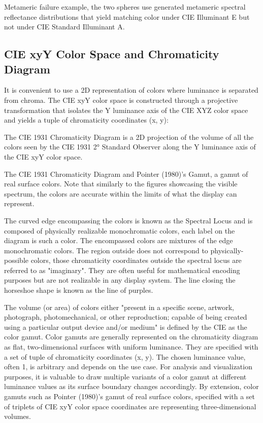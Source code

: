 Metameric failure example, the two spheres use generated metameric spectral reflectance distributions that yield matching color under CIE Illuminant E but not under CIE Standard Illuminant A.

\subsection{CIE xyY Color Space and Chromaticity Diagram}

It is convenient to use a 2D representation of colors where luminance is separated from chroma. The CIE xyY color space is constructed through a projective transformation that isolates the Y luminance axis of the CIE XYZ color space and yields a tuple of chromaticity coordinates (x, y):

The CIE 1931 Chromaticity Diagram is a 2D projection of the volume of all the colors seen by the CIE 1931 2° Standard Observer along the Y luminance axis of the CIE xyY color space.

The CIE 1931 Chromaticity Diagram and Pointer (1980)'s Gamut, a gamut of real surface colors. Note that similarly to the figures showcasing the visible spectrum, the colors are accurate within the limits of what the display can represent.

The curved edge encompassing the colors is known as the Spectral Locus and is composed of physically realizable monochromatic colors, each label on the diagram is such a color. The encompassed colors are mixtures of the edge monochromatic colors. The region outside does not correspond to physically-possible colors, those chromaticity coordinates outside the spectral locus are referred to as "imaginary". They are often useful for mathematical encoding purposes but are not realizable in any display system. The line closing the horseshoe shape is known as the line of purples.

The volume (or area) of colors either "present in a specific scene, artwork, photograph, photomechanical, or other reproduction; capable of being created using a particular output device and/or medium" is defined by the CIE as the color gamut. Color gamuts are generally represented on the chromaticity diagram as flat, two-dimensional surfaces with uniform luminance. They are specified with a set of tuple of chromaticity coordinates (x, y). The chosen luminance value, often 1, is arbitrary and depends on the use case. For analysis and visualization purposes, it is valuable to draw multiple variants of a color gamut at different luminance values as its surface boundary changes accordingly. By extension, color gamuts such as Pointer (1980)'s gamut of real surface colors, specified with a set of triplets of CIE xyY color space coordinates are representing three-dimensional volumes.

